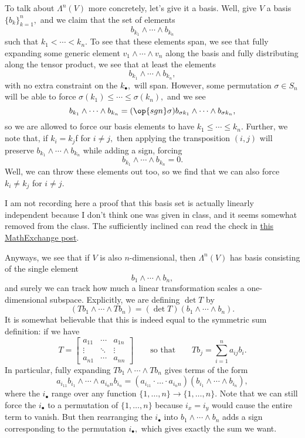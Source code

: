 To talk about $\Lambda^n(V)$ more concretely, let's give it a basis. Well, give $V$ a basis $\{b_k\}_{k=1}^n,$ and we claim that the set of elements
\[b_{k_1}\wedge\cdots\wedge b_{k_n}\]
such that $k_1<\cdots<k_n.$ To see that these elements span, we see that fully expanding some generic element $v_1\wedge\cdots\wedge v_n$ along the basis and fully distributing along the tensor product, we see that at least the elements
\[b_{k_1}\wedge\cdots\wedge b_{k_n},\]
with no extra constraint on the $k_\bullet,$ will span. However, some permutation $\sigma\in S_n$ will be able to force $\sigma(k_1)\le\cdots\le\sigma(k_n),$ and we see
\[b_{k_1}\wedge\cdots\wedge b_{k_n}=(\op{sgn}\sigma)b_{\sigma k_1}\wedge\cdots\wedge b_{\sigma k_n},\]
so we are allowed to force our basis elements to have $k_1\le\cdots\le k_n.$ Further, we note that, if $k_i=k_j$f for $i\ne j,$ then applying the transposition $(i,j)$ will preserve $b_{k_1}\wedge\cdots\wedge b_{k_n}$ while adding a sign, forcing
\[b_{k_1}\wedge\cdots\wedge b_{k_n}=0.\]
Well, we can throw these elements out too, so we find that we can also force $k_i\ne k_j$ for $i\ne j.$
\begin{remark}[Nir]
	I am not recording here a proof that this basis set is actually linearly independent because I don't think one was given in class, and it seems somewhat removed from the class. The sufficiently inclined can read the check in \href{https://math.stackexchange.com/a/53562/869257}{this MathExchange post}.
\end{remark}
Anyways, we see that if $V$ is also $n$-dimensional, then $\Lambda^n(V)$ has basis consisting of the single element
\[b_1\wedge\cdots\wedge b_n,\]
and surely we can track how much a linear transformation scales a one-dimensional subspace. Explicitly, we are defining $\det T$ by
\[(Tb_1\wedge\cdots\wedge Tb_n)=(\det T)(b_1\wedge\cdots\wedge b_n).\]
It is somewhat believable that this is indeed equal to the symmetric sum definition: if we have
\[T=\begin{bmatrix}
	a_{11} & \cdots & a_{1n} \\
	\vdots & \ddots & \vdots \\
	a_{n1} & \cdots & a_{nn}
\end{bmatrix}\qquad\text{so that}\qquad Tb_j=\sum_{i=1}^na_{ij}b_i.\]
In particular, fully expanding $Tb_1\wedge\cdots\wedge Tb_n$ gives terms of the form
\[a_{i_11}b_{i_1}\wedge\cdots\wedge a_{i_nn}b_{i_n}=(a_{i_11}\cdot\ldots\cdot a_{i_nn})(b_{i_1}\wedge\cdots\wedge b_{i_n}),\]
where the $i_\bullet$ range over any function $\{1,\ldots,n\}\to\{1,\ldots,n\}.$ Note that we can still force the $i_\bullet$ to a permutation of $\{1,\ldots,n\}$ because $i_x=i_y$ would cause the entire term to vanish. But then rearranging the $i_\bullet$ into $b_1\wedge\cdots\wedge b_n$ adds a sign corresponding to the permutation $i_\bullet,$ which gives exactly the sum we want.


